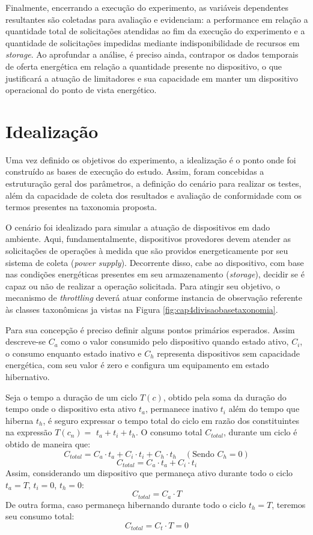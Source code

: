 Finalmente, encerrando a execução do experimento, as variáveis dependentes resultantes são coletadas para avaliação e evidenciam: a performance em relação a quantidade total de solicitações atendidas ao fim da execução do experimento e a quantidade de solicitações impedidas mediante indisponibilidade de recursos em \textit{storage}. Ao aprofundar a análise, é preciso ainda, contrapor os dados temporais de oferta energética em relação a quantidade presente no dispositivo, o que justificará a atuação de limitadores e sua capacidade em manter um dispositivo operacional do ponto de vista energético.


\section{Idealização}
\label{cap6:idealizacao}
Uma vez definido os objetivos do experimento, a idealização é o ponto onde foi construído as bases de execução do estudo. Assim, foram concebidas a estruturação geral dos parâmetros, a  definição do cenário para realizar os testes, além da capacidade de coleta dos resultados e avaliação de conformidade com os termos presentes na taxonomia proposta.

O cenário foi idealizado para simular a atuação de dispositivos em dado ambiente. Aqui, fundamentalmente, dispositivos provedores devem atender as solicitações de operações à medida que são providos energeticamente por seu sistema de coleta (\textit{power supply}). Decorrente disso, cabe ao dispositivo, com base nas condições energéticas presentes em seu armazenamento (\textit{storage}), decidir se é capaz ou não de realizar a operação solicitada. Para atingir seu objetivo, o mecanismo de \textit{throttling} deverá atuar conforme instancia de observação referente às classes taxonômicas ja vistas na Figura \ref{fig:cap4divisaobasetaxonomia}.

Para sua concepção é preciso definir alguns pontos primários esperados. Assim descreve-se \( C_a \) como o valor consumido pelo dispositivo quando estado ativo, \( C_i \), o consumo enquanto estado inativo e \( C_h \) representa dispositivos sem capacidade energética, com seu valor é zero e configura um equipamento em estado hibernativo. 

Seja o tempo a duração de um ciclo $T(c)$, obtido pela soma da duração do tempo onde o dispositivo esta ativo \( t_a \), permanece inativo \( t_i \) além do tempo que hiberna \( t_h \), é seguro expressar o tempo total do ciclo em razão dos constituintes na expressão $T(c_n) = $ \( t_a + t_i + t_h \). O consumo total $C_{total}$, durante um ciclo é obtido de maneira que:
\[C_{total} = C_a \cdot t_a + C_i \cdot t_i + C_h \cdot t_h \quad (\text{Sendo }C_h = 0)\]
\[C_{total} = C_a \cdot t_a + C_i \cdot t_i\]
Assim, considerando um dispositivo que permaneça ativo durante todo o ciclo \( t_a = T \), \( t_i = 0 \), \( t_h = 0 \):
\[ C_{total} = C_a \cdot T \]
De outra forma, caso permaneça hibernando durante todo o ciclo \( t_h = T \), teremos seu consumo total:
\[ C_{total} = C_t \cdot T = 0 \]

